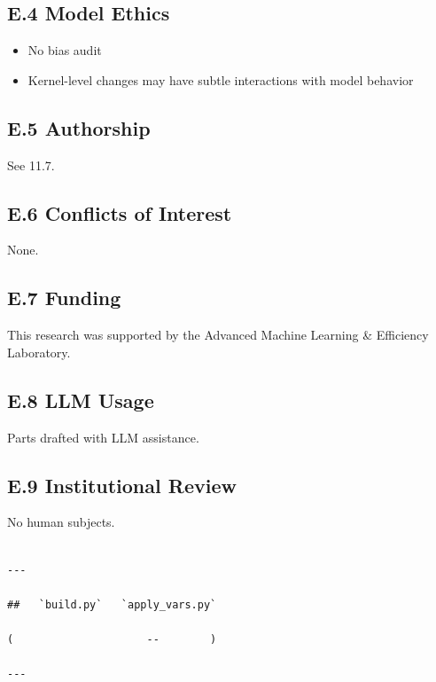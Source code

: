 \subsection{E.4 Model Ethics}

\begin{itemize}
\item No bias audit
\item Kernel-level changes may have subtle interactions with model behavior

\end{itemize}
\subsection{E.5 Authorship}

See  11.7.

\subsection{E.6 Conflicts of Interest}

None.

\subsection{E.7 Funding}

This research was supported by the Advanced Machine Learning \& Efficiency Laboratory.

\subsection{E.8 LLM Usage}

Parts drafted with LLM assistance.

\subsection{E.9 Institutional Review}

No human subjects.
\begin{lstlisting}

---

##   `build.py`   `apply_vars.py`

(                     --        )

---
\end{lstlisting}